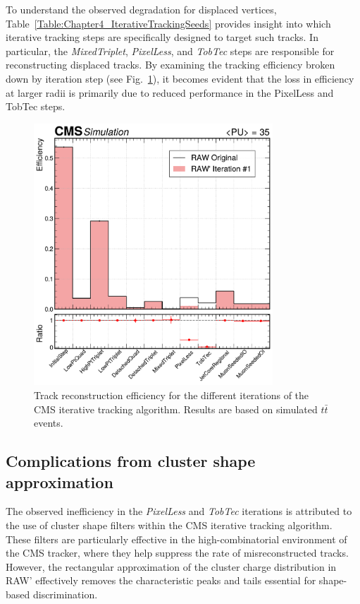 To understand the observed degradation for displaced vertices, Table~\ref{Table:Chapter4_IterativeTrackingSeeds} provides insight into which iterative tracking steps are specifically designed to target such tracks. In particular, the \textit{MixedTriplet}, \textit{PixelLess}, and \textit{TobTec} steps are responsible for reconstructing displaced tracks. By examining the tracking efficiency broken down by iteration step (see Fig.~\ref{Figure:Chapter5_TrackingPerformance_bystep}), it becomes evident that the loss in efficiency at larger radii is primarily due to reduced performance in the PixelLess and TobTec steps.

\begin{figure}[h]
\centering
\includegraphics[width=0.8\textwidth]{Figures/Chapter5/efficiency_with_ratio.pdf}
\caption[Track reconstruction efficiency for the different iterations of the CMS iterative tracking algorithm.]{Track reconstruction efficiency for the different iterations of the CMS iterative tracking algorithm. Results are based on simulated $t\bar{t}$ events.}
\label{Figure:Chapter5_TrackingPerformance_bystep}
\end{figure}

\subsection{Complications from cluster shape approximation}

The observed inefficiency in the \textit{PixelLess} and \textit{TobTec} iterations is attributed to the use of cluster shape filters within the CMS iterative tracking algorithm. These filters are particularly effective in the high-combinatorial environment of the CMS tracker, where they help suppress the rate of misreconstructed tracks. However, the rectangular approximation of the cluster charge distribution in RAW' effectively removes the characteristic peaks and tails essential for shape-based discrimination.

